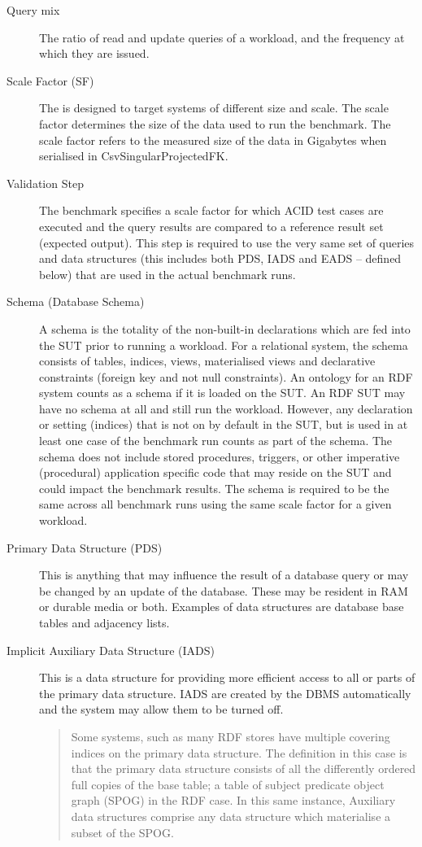 \begin{description}
    \item[Query mix] The ratio of read and update queries of a workload, and the frequency at which they are issued.
    
    \item[Scale Factor (SF)] The \ldbcsnb is designed to target systems of different size and scale. The scale factor determines the size of the data used to run the benchmark. The scale factor refers to the measured size of the data in Gigabytes when serialised in CsvSingularProjectedFK.

    \item[Validation Step] The benchmark specifies a scale factor for which ACID test cases are executed and the query results are compared to a reference result set (\ie expected output). This step is required to use the very same set of queries and data structures (this includes both PDS, IADS and EADS -- defined below) that are used in the actual benchmark runs. 
    
    \item[Schema (Database Schema)] A schema is the totality of the non-built-in declarations which are fed into the SUT prior to running a workload. For a relational system, the schema consists of tables, indices, views, materialised views and declarative constraints (\eg foreign key and not null constraints). An ontology for an RDF system counts as a schema if it is loaded on the SUT. An RDF SUT may have no schema at all and still run the workload. However, any declaration or setting (\eg indices) that is not on by default in the SUT, but is used in at least one case of the benchmark run counts as part of the schema.
    The schema does not include stored procedures, triggers, or other imperative (procedural) application specific code that may reside on the SUT and could impact the benchmark results. The schema is required to be the same across all benchmark runs using the same scale factor for a given workload.

    \item[Primary Data Structure (PDS)] 
    This is anything that may influence the result of a database query or may be changed by an update of the database. These may be resident in RAM or durable media or both. Examples of data structures are database base tables and adjacency lists.

    \item[Implicit Auxiliary Data Structure (IADS)] This is a data structure for providing more efficient access to all or parts of the primary data structure. IADS are created by the DBMS automatically and the system may allow them to be turned off. 
    \begin{quote}
        Some systems, such as many RDF stores have multiple covering indices on the primary data structure. The definition in this case is that the primary data structure consists of all the differently ordered full copies of the base table; a table of subject predicate object graph (SPOG) in the RDF case. In this same instance, Auxiliary data structures comprise any data structure which materialise a subset of the SPOG.    
    \end{quote}
    

\end{description}
